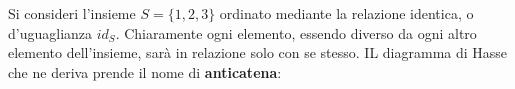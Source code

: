 \begin{example}
	Si consideri l'insieme $S=\{1,2,3\}$ ordinato mediante la relazione identica, o d'uguaglianza $id_{S}$. Chiaramente ogni elemento, essendo diverso da ogni altro elemento dell'insieme, sarà in relazione solo con se stesso. IL diagramma di Hasse che ne deriva prende il nome di \textbf{anticatena}:
	\medskip
	
	\begin{center}
	\end{center}
\end{example}

